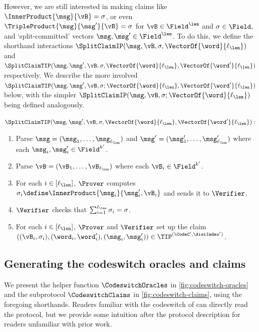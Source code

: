 However, we are still interested in making claims like $\InnerProduct{\msg}{\vB} = \sigma$, or even $\TripleProduct{\msg}{\msg'}{\vB} = \sigma$ for $\vB \in \Field^{\len}$ and $\sigma \in \Field$, and `split-committed' vectors $\msg, \msg' \in \Field^\len$. To do this, we define the shorthand interactions $\SplitClaimIP(\msg, \vB, \sigma, \VectorOf{\word}{\ell_{\len}})$ and $\SplitClaimTIP(\msg, \msg', \vB, \sigma, \VectorOf{\word}{\ell_{\len}}, \VectorOf{\word'}{\ell_{\len}})$ respectively.
We describe the more involved $\SplitClaimTIP(\msg, \msg', \vB, \sigma; \VectorOf{\word}{\ell_{\len}}, \VectorOf{\word'}{\ell_{\len}})$ below, with the simpler $\SplitClaimIP(\msg, \vB, \sigma; \VectorOf{\word}{\ell_{\len}})$ being defined analogously.
\begin{tcolorbox}[breakable, enhanced, colback=white, boxrule=0.65pt]
    $\SplitClaimTIP(\msg, \msg', \vB, \sigma, \VectorOf{\word}{\ell_{\len}}, \VectorOf{\word'}{\ell_{\len}}):$
    \begin{enumerate}[nolistsep]
        \item Parse $\msg = (\msg_1, \dotsc, \msg_{\ell_{\len}})$ and $\msg' = (\msg'_1, \dotsc, \msg'_{\ell_{\len}})$ where each $\msg_i, \msg'_i \in \Field^{k'}$.
        \item Parse $\vB = (\vB_1, \dotsc, \vB_{\ell_{\len}})$ where each $\vB_i \in \Field^{k'}$.
        \item For each $i \in [\ell_{\len}]$, $\Prover$ computes $\sigma_i \define \InnerProduct{\msg_i}{\msg'_i, \vB_i}$ and sends it to $\Verifier$.
        \item $\Verifier$ checks that $\sum_{i=1}^{\ell_{\len}} \sigma_i = \sigma$.
        \item For each $i \in [\ell_{\len}]$, $\Prover$ and $\Verifier$ set up the claim $((\vB_i, \sigma_i), (\word_i, \word'_i), (\msg_i, \msg'_i)) \in \TIP^{(\CodeC', \distIndex')}$.
    \end{enumerate}
\end{tcolorbox}


\subsection{Generating the codeswitch oracles and claims}
\label{sec:codeswitch-claims}


We present the helper function $\CodeswitchOracles$ in \cref{fig:codeswitch-oracles} and the subprotocol $\CodeswitchClaims$ in \cref{fig:codeswitch-claims}, using the foregoing shorthands.
Readers familiar with the codeswitch of \cite{BrehmCFRRZ24} can directly read the protocol, but we provide some intuition after the protocol description for readers unfamiliar with prior work.

